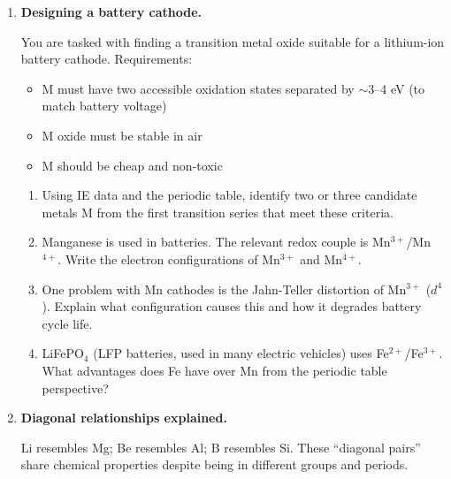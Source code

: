 \documentclass[12pt, a4paper]{book}
\begin{document}
\begin{deepbox}
\begin{enumerate}[label=\textbf{D\arabic*.}]

  \item \textbf{Designing a battery cathode.}

        You are tasked with finding a transition metal oxide
         suitable for a lithium-ion battery cathode.
        Requirements:
        \begin{itemize}[nosep]
          \item M must have two accessible oxidation states
                separated by $\sim 3$--4 eV (to match battery voltage)
          \item M oxide must be stable in air
          \item M should be cheap and non-toxic
        \end{itemize}
        \begin{enumerate}[label=(\alph*)]
          \item Using IE data and the periodic table,
                identify two or three candidate metals M
                from the first transition series
                that meet these criteria.
          \item Manganese is used in  batteries.
                The relevant redox couple is
                Mn$^{3+}$/Mn$^{4+}$.
                Write the electron configurations of
                Mn$^{3+}$ and Mn$^{4+}$.
          \item One problem with Mn cathodes is the
                Jahn-Teller distortion of Mn$^{3+}$ ($d^4$).
                Explain what configuration causes this
                and how it degrades battery cycle life.
          \item LiFePO$_4$ (LFP batteries, used in many
                electric vehicles) uses Fe$^{2+}$/Fe$^{3+}$.
                What advantages does Fe have over Mn
                from the periodic table perspective?
        \end{enumerate}

  \item \textbf{Diagonal relationships explained.}

        Li resembles Mg; Be resembles Al; B resembles Si.
        These ``diagonal pairs'' share chemical properties
        despite being in different groups and periods.


\end{enumerate}
\end{deepbox}
\end{document}
